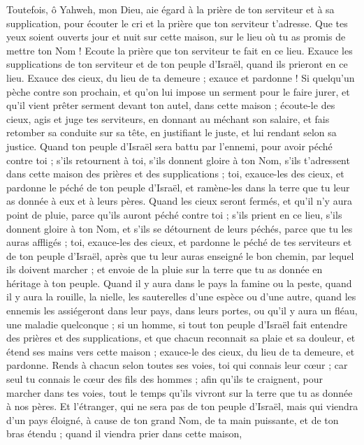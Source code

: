 \begin{multicols}{2}
Toutefois, ô Yahweh, mon Dieu, aie égard à la prière de ton serviteur et à sa supplication, pour écouter le cri et la prière que ton serviteur t'adresse.
Que tes yeux soient ouverts jour et nuit sur cette maison, sur le lieu où tu as promis de mettre ton Nom ! Ecoute la prière que ton serviteur te fait en ce lieu.
Exauce les supplications de ton serviteur et de ton peuple d'Israël, quand ils prieront en ce lieu. Exauce des cieux, du lieu de ta demeure ; exauce et pardonne !
Si quelqu'un pèche contre son prochain, et qu'on lui impose un serment pour le faire jurer, et qu'il vient prêter serment devant ton autel, dans cette maison ;
écoute-le des cieux, agis et juge tes serviteurs, en donnant au méchant son salaire, et fais retomber sa conduite sur sa tête, en justifiant le juste, et lui rendant selon sa justice.
Quand ton peuple d'Israël sera battu par l'ennemi, pour avoir péché contre toi ; s'ils retournent à toi, s'ils donnent gloire à ton Nom, s'ils t'adressent dans cette maison des prières et des supplications ;
toi, exauce-les des cieux, et pardonne le péché de ton peuple d'Israël, et ramène-les dans la terre que tu leur as donnée à eux et à leurs pères.
Quand les cieux seront fermés, et qu'il n'y aura point de pluie, parce qu'ils auront péché contre toi ; s'ils prient en ce lieu, s'ils donnent gloire à ton Nom, et s'ils se détournent de leurs péchés, parce que tu les auras affligés ;
toi, exauce-les des cieux, et pardonne le péché de tes serviteurs et de ton peuple d'Israël, après que tu leur auras enseigné le bon chemin, par lequel ils doivent marcher ; et envoie de la pluie sur la terre que tu as donnée en héritage à ton peuple.
Quand il y aura dans le pays la famine ou la peste, quand il y aura la rouille, la nielle, les sauterelles d'une espèce ou d'une autre, quand les ennemis les assiégeront dans leur pays, dans leurs portes, ou qu'il y aura un fléau, une maladie quelconque ;
si un homme, si tout ton peuple d'Israël fait entendre des prières et des supplications, et que chacun reconnait sa plaie et sa douleur, et étend ses mains vers cette maison ;
exauce-le des cieux, du lieu de ta demeure, et pardonne. Rends à chacun selon toutes ses voies, toi qui connais leur cœur ; car seul tu connais le cœur des fils des hommes ;
afin qu'ils te craignent, pour marcher dans tes voies, tout le temps qu'ils vivront sur la terre que tu as donnée à nos pères.
Et l'étranger, qui ne sera pas de ton peuple d'Israël, mais qui viendra d'un pays éloigné, à cause de ton grand Nom, de ta main puissante, et de ton bras étendu ; quand il viendra prier dans cette maison,

\end{multicols}
